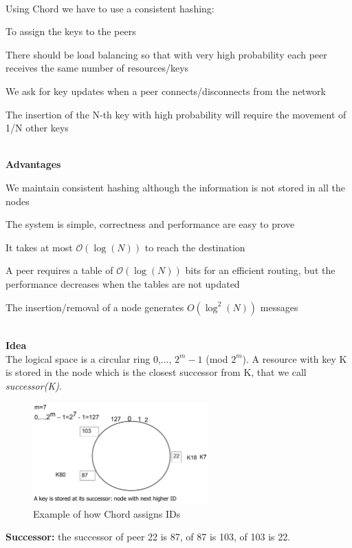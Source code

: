 \documentclass[paper=a4, fontsize=11pt]{scrartcl} %
\numberwithin{equation}{section} %
\numberwithin{figure}{section} %
\numberwithin{table}{section} %
\begin{document}
~ \\
Using Chord we have to use a consistent hashing:
\begin{compactitem}
\item To assign the keys to the peers
\item There should be load balancing so that with very high probability each peer receives the same number of resources/keys
\item We ask for key updates when a peer connects/disconnects from the network
\item The insertion of the N-th key with high probability will require the movement of 1/N other keys
\end{compactitem}
 ~ \\
\textbf{Advantages}
\begin{compactitem}
\item We maintain consistent hashing although the information is not stored in all the nodes
\item The system is simple, correctness and performance are easy to prove
\item It takes at most $\mathcal{O}(\log(N))$ to reach the destination
\item A peer requires a table of $\mathcal{O}(\log(N))$ bits for an efficient routing, but the performance decreases when the tables are not updated
\item The insertion/removal of a node generates $O(\log^2(N))$ messages
\end{compactitem}
 ~ \\ 
\textbf{Idea} \\
The logical space is a circular ring 0,..., $2^m-1$  (mod $2^m$). A resource with key K is stored in the node which is the closest successor from K, that we call \textit{successor(K)}.
 \begin{figure}[H]
  \centering
  \includegraphics[width=0.6\textwidth]{img/chord_ex.png}
  \caption{Example of how Chord assigns IDs}
  
\end{figure}
\textbf{Successor:} the successor of peer 22 is 87, of 87 is 103, of 103 is 22.\\
\end{document}
